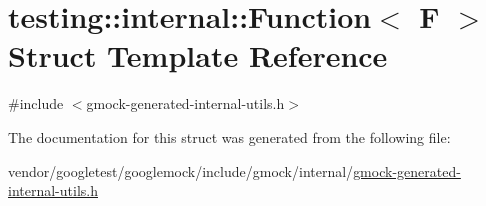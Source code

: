 \hypertarget{structtesting_1_1internal_1_1_function}{}\section{testing\+:\+:internal\+:\+:Function$<$ F $>$ Struct Template Reference}
\label{structtesting_1_1internal_1_1_function}


{\ttfamily \#include $<$gmock-\/generated-\/internal-\/utils.\+h$>$}



The documentation for this struct was generated from the following file\+:\begin{DoxyCompactItemize}
\item 
vendor/googletest/googlemock/include/gmock/internal/\hyperlink{gmock-generated-internal-utils_8h}{gmock-\/generated-\/internal-\/utils.\+h}\end{DoxyCompactItemize}
